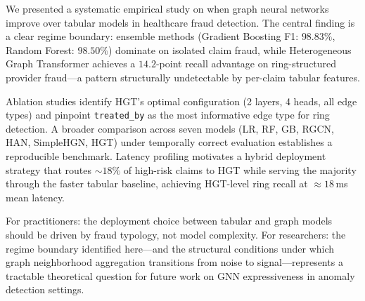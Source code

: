 \documentclass[pdflatex,sn-mathphys-num]{sn-jnl}
\theoremstyle{thmstyleone}
\theoremstyle{thmstyletwo}
\theoremstyle{thmstylethree}
\begin{document}
We presented a systematic empirical study on when graph neural networks
improve over tabular models in healthcare fraud detection. The central
finding is a clear regime boundary: ensemble methods (Gradient Boosting
F1: $98.83\%$, Random Forest: $98.50\%$) dominate on isolated claim
fraud, while Heterogeneous Graph Transformer achieves a $14.2$-point
recall advantage on ring-structured provider fraud---a pattern
structurally undetectable by per-claim tabular features.

Ablation studies identify HGT's optimal configuration (2 layers, 4
heads, all edge types) and pinpoint \texttt{treated\_by} as the most
informative edge type for ring detection. A broader comparison across
seven models (LR, RF, GB, RGCN, HAN, SimpleHGN, HGT) under temporally
correct evaluation establishes a reproducible benchmark. Latency
profiling motivates a hybrid deployment strategy that routes
$\sim\!18\%$ of high-risk claims to HGT while serving the majority
through the faster tabular baseline, achieving HGT-level ring recall
at $\approx 18$\,ms mean latency.

For practitioners: the deployment choice between tabular and graph
models should be driven by fraud typology, not model complexity. For
researchers: the regime boundary identified here---and the structural
conditions under which graph neighborhood aggregation transitions from
noise to signal---represents a tractable theoretical question for future
work on GNN expressiveness in anomaly detection settings.
\end{document}
